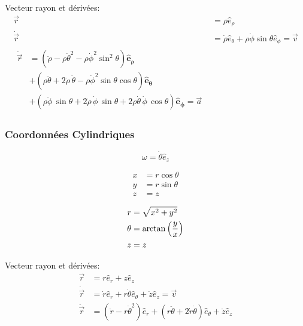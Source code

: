 \documentclass[10pt,a4paper]{article}
\begin{document}
Vecteur rayon et dérivées:
\begin{align*}
\vec{r} &= \rho \hat{e}_{\rho} \\
\dot{\vec{r}} &= \dot{\rho}\hat{e}_{\theta} + \rho\dot{\phi}\sin\theta\hat{e}_{\phi} = \vec{v} \\
\begin{split}
\ddot{\vec{r}} &= \left( \ddot{\rho} - \rho\dot\theta^2 - \rho\dot\phi^2\sin^2\theta \right)\mathbf{\hat{e}_\rho} \\
&+ \left( \rho\ddot\theta + 2\dot{\rho}\,\dot\theta - \rho\dot\phi^2\sin\theta\cos\theta \right) \mathbf{\hat{e}_\theta}\\
&+ \left( \rho\ddot\phi\,\sin\theta + 2\dot{\rho}\,\dot\phi\,\sin\theta + 2 \rho\dot\theta\,\dot\phi\,\cos\theta \right) \mathbf{\hat{e}_\phi} = \vec{a}
\end{split}
\end{align*}

\subsubsection{Coordonnées Cylindriques}

$$\omega = \dot\theta \hat e_z$$

\begin{multicols}{3}
\begin{align*}
x &= r  \cos\theta \\
y &= r  \sin\theta \\
z &= z
\end{align*}

\columnbreak



\columnbreak

\begin{align*}
r & = \sqrt{x^2 + y^2}\\
\theta & = \arctan\left({y \over x}\right) \\
z & = z
\end{align*}

\end{multicols}

Vecteur rayon et dérivées:
\begin{align*}
\vec{r} &= r \hat e_r + z\hat e_z \\
\dot{\vec{r}} &= \dot r \hat e_r + r \dot\theta\hat e_\theta + \dot z \hat e_z = \vec{v} \\
\ddot{\vec{r}} &= \left(\ddot r - r\dot\theta^2 \right)\hat e_r 
+ \left( r\ddot\theta + 2\dot r \dot \theta \right) \hat e_\theta + \ddot z \hat e_z 
\end{align*}
\end{document}
